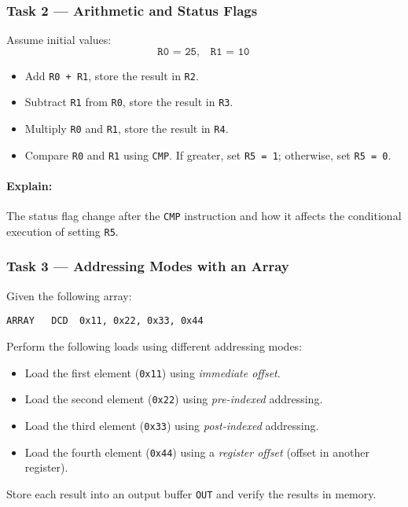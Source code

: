 \subsubsection{Task 2 --- Arithmetic and Status Flags}
Assume initial values:
\[
\texttt{R0 = 25}, \quad \texttt{R1 = 10}
\]

\begin{itemize}[nosep]
    \item Add \texttt{R0 + R1}, store the result in \texttt{R2}.
    \item Subtract \texttt{R1} from \texttt{R0}, store the result in \texttt{R3}.
    \item Multiply \texttt{R0} and \texttt{R1}, store the result in \texttt{R4}.
    \item Compare \texttt{R0} and \texttt{R1} using \texttt{CMP}.
          If greater, set \texttt{R5 = 1}; otherwise, set \texttt{R5 = 0}.
\end{itemize}
\paragraph{Explain:} The status flag change after the \texttt{CMP} instruction and how it affects the conditional execution of setting \texttt{R5}.

\subsubsection{Task 3 --- Addressing Modes with an Array}
Given the following array:
\begin{lstlisting}
ARRAY   DCD  0x11, 0x22, 0x33, 0x44
\end{lstlisting}

Perform the following loads using different addressing modes:
\begin{itemize}[nosep]
    \item Load the first element (\texttt{0x11}) using \emph{immediate offset}.
    \item Load the second element (\texttt{0x22}) using \emph{pre-indexed} addressing.
    \item Load the third element (\texttt{0x33}) using \emph{post-indexed} addressing.
    \item Load the fourth element (\texttt{0x44}) using a \emph{register offset} (offset in another register).
\end{itemize}

Store each result into an output buffer \texttt{OUT} and verify the results in memory.

